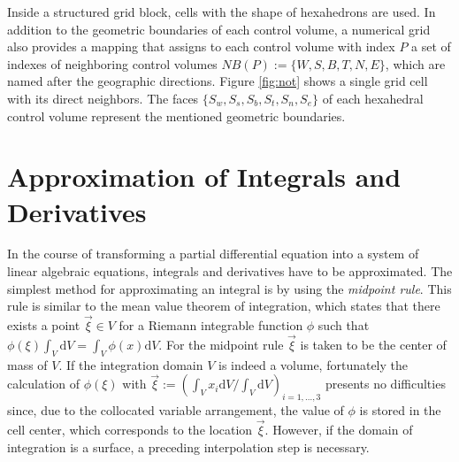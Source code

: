 Inside a structured grid block, cells with the shape of hexahedrons are used. In addition to the geometric boundaries of each control volume, a numerical grid also provides a mapping that assigns to each control volume with index \(P\) a set of indexes of neighboring control volumes \(NB(P):=\{W,S,B,T,N,E\}\), which are named after the geographic directions. Figure \ref{fig:not} shows a single grid cell with its direct neighbors. The faces \(\{S_w,S_s,S_b,S_t,S_n,S_e\}\) of each hexahedral control volume represent the mentioned geometric boundaries. 

\begin{figure}[h]
  \hfil
 \end{figure}

\section{Approximation of Integrals and Derivatives}
\label{sec:approxintegralderivative}

In the course of transforming a partial differential equation into a system of linear algebraic equations, integrals and derivatives have to be approximated. The simplest method for approximating an integral is by using the \emph{midpoint rule}. This rule is similar to the mean value theorem of integration, which states that there exists a point \(\vec{\xi} \in V\) for a Riemann integrable function \(\phi\) such that \(\textstyle \phi(\xi) \int_V \mathrm{d}V = \int_V \phi(x) \mathrm{d}V\). For the midpoint rule \(\vec{\xi}\) is taken to be the center of mass of \(V\). If the integration domain \(V\) is indeed a volume, fortunately the calculation of \(\phi(\mathbb{\xi})\) with \(\textstyle \vec{\xi} := \left({ \int_V x_i \mathrm{d}V }/{ \int_V \mathrm{d}V } \right)_{i = 1,\dots,3}\) presents no difficulties since, due to the collocated variable arrangement, the value of \(\phi\) is stored in the cell center, which corresponds to the location \(\vec{\xi}\). However, if the domain of integration is a surface, a preceding interpolation step is necessary.

